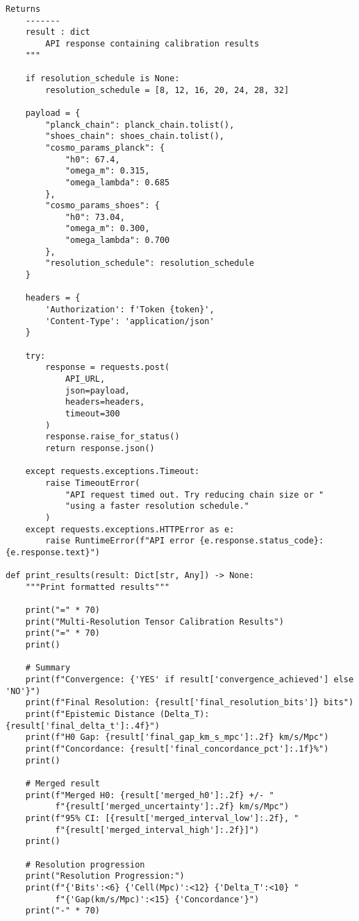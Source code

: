 \documentclass[11pt]{article}
\begin{document}
\begin{lstlisting}[style=python, caption={Production-ready implementation}]
    Returns
    -------
    result : dict
        API response containing calibration results
    """

    if resolution_schedule is None:
        resolution_schedule = [8, 12, 16, 20, 24, 28, 32]

    payload = {
        "planck_chain": planck_chain.tolist(),
        "shoes_chain": shoes_chain.tolist(),
        "cosmo_params_planck": {
            "h0": 67.4,
            "omega_m": 0.315,
            "omega_lambda": 0.685
        },
        "cosmo_params_shoes": {
            "h0": 73.04,
            "omega_m": 0.300,
            "omega_lambda": 0.700
        },
        "resolution_schedule": resolution_schedule
    }

    headers = {
        'Authorization': f'Token {token}',
        'Content-Type': 'application/json'
    }

    try:
        response = requests.post(
            API_URL,
            json=payload,
            headers=headers,
            timeout=300
        )
        response.raise_for_status()
        return response.json()

    except requests.exceptions.Timeout:
        raise TimeoutError(
            "API request timed out. Try reducing chain size or "
            "using a faster resolution schedule."
        )
    except requests.exceptions.HTTPError as e:
        raise RuntimeError(f"API error {e.response.status_code}: {e.response.text}")

def print_results(result: Dict[str, Any]) -> None:
    """Print formatted results"""

    print("=" * 70)
    print("Multi-Resolution Tensor Calibration Results")
    print("=" * 70)
    print()

    # Summary
    print(f"Convergence: {'YES' if result['convergence_achieved'] else 'NO'}")
    print(f"Final Resolution: {result['final_resolution_bits']} bits")
    print(f"Epistemic Distance (Delta_T): {result['final_delta_t']:.4f}")
    print(f"H0 Gap: {result['final_gap_km_s_mpc']:.2f} km/s/Mpc")
    print(f"Concordance: {result['final_concordance_pct']:.1f}%")
    print()

    # Merged result
    print(f"Merged H0: {result['merged_h0']:.2f} +/- "
          f"{result['merged_uncertainty']:.2f} km/s/Mpc")
    print(f"95% CI: [{result['merged_interval_low']:.2f}, "
          f"{result['merged_interval_high']:.2f}]")
    print()

    # Resolution progression
    print("Resolution Progression:")
    print(f"{'Bits':<6} {'Cell(Mpc)':<12} {'Delta_T':<10} "
          f"{'Gap(km/s/Mpc)':<15} {'Concordance'}")
    print("-" * 70)


\end{lstlisting}
\end{document}
